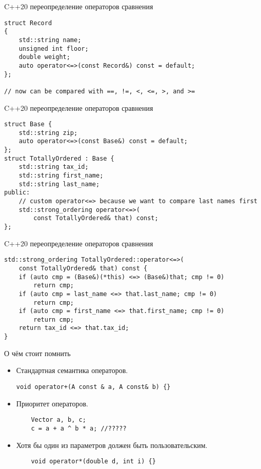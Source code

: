 \documentclass{beamer}
\begin{document}
\begin{frame}[fragile]{C++20 переопределение операторов сравнения}
    \begin{lstlisting}[basicstyle=\fontsize{9pt}{1em}\ttfamily]
struct Record
{
    std::string name;
    unsigned int floor;
    double weight;
    auto operator<=>(const Record&) const = default;
};

// now can be compared with ==, !=, <, <=, >, and >=
    \end{lstlisting}
\end{frame}

\begin{frame}[fragile]{C++20 переопределение операторов сравнения}
    \begin{lstlisting}[basicstyle=\fontsize{9pt}{1em}\ttfamily]
struct Base {
    std::string zip;
    auto operator<=>(const Base&) const = default;
};
struct TotallyOrdered : Base {
    std::string tax_id;
    std::string first_name;
    std::string last_name;
public:
    // custom operator<=> because we want to compare last names first
    std::strong_ordering operator<=>(
        const TotallyOrdered& that) const;
};
    \end{lstlisting}
\end{frame}

\begin{frame}[fragile]{C++20 переопределение операторов сравнения}
    \begin{lstlisting}[basicstyle=\fontsize{9pt}{1em}\ttfamily]
std::strong_ordering TotallyOrdered::operator<=>(
    const TotallyOrdered& that) const {
    if (auto cmp = (Base&)(*this) <=> (Base&)that; cmp != 0)
        return cmp;
    if (auto cmp = last_name <=> that.last_name; cmp != 0)
        return cmp;
    if (auto cmp = first_name <=> that.first_name; cmp != 0)
        return cmp;
    return tax_id <=> that.tax_id;
}
    \end{lstlisting}
\end{frame}

\begin{frame}[fragile]{О чём стоит помнить}
    \begin{itemize}
        \item Стандартная семантика операторов.
\begin{lstlisting}
void operator+(A const & a, A const& b) {}
\end{lstlisting}
        \item Приоритет операторов.
\begin{lstlisting}
    Vector a, b, c;
    c = a + a ^ b * a; //?????
\end{lstlisting}
    \item Хотя бы один из параметров должен быть пользовательским.
\begin{lstlisting}
    void operator*(double d, int i) {}
\end{lstlisting}
    \end{itemize}
\end{frame}
\end{document}

